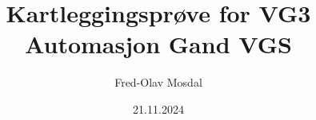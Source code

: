 \title {Kartleggingsprøve for VG3 Automasjon Gand VGS} 
\author {Fred-Olav Mosdal}
\date {21.11.2024}
\maketitle
